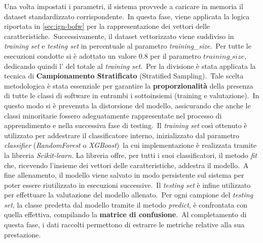\FloatBarrier

Una volta impostati i parametri, il sistema provvede a caricare in memoria il dataset standardizzato corrispondente.\
In questa fase, viene applicata la logica riportata in \autoref{sec:ign-bofw} per la rappresentazione dei vettori delle caratteristiche.\
Successivamente, il dataset vettorizzato viene suddiviso in \textit{training set} e \textit{testing set} in percentuale al parametro \textit{training\_size}.\
Per tutte le esecuzioni condotte si è adottato un valore $0.8$ per il parametro $training\_size$, dedicando quindi
l'\percc{80} del totale al \textit{training set}.\
Per la divisione è stata applicata la tecnica di \textbf{Campionamento Stratificato} (Stratified Sampling).\
Tale scelta metodologica è stata essenziale per garantire la \textbf{proporzionalità} della presenza di tutte le classi di software in entrambi i sottoinsiemi (training e valutazione).\
In questo modo si è prevenuta la distorsione del modello, assicurando che anche le classi minoritarie fossero adeguatamente
rappresentate nel processo di apprendimento e nella successiva fase di testing.\
Il \textit{training set} così ottenuto è utilizzato per addestrare il classificatore interno, inizializzato dal parametro \textit{classifier} (\textit{RandomForest} o \textit{XGBoost})\
la cui implementazione è realizzata tramite la libreria \textit{Scikit-learn}.
La libreria offre, per tutti i suoi classificatori, il metodo \textit{fit} che, ricevendo l'insieme dei vettori delle caratteristiche, addestra il modello.\
A fine allenamento, il modello viene salvato in modo persistente sul sistema per poter essere riutilizzato in esecuzioni successive.\
Il \textit{testing set} è infine utilizzato per effettuare la valutazione del modello allenato.\
Per ogni campione del \textit{testing set}, la classe predetta dal modello tramite il metodo \textit{predict}, è confrontata con quella effettiva, compilando la \textbf{matrice di confusione}.\
Al completamento di questa fase, i dati raccolti permettono di estrarre le metriche relative alla sua prestazione.